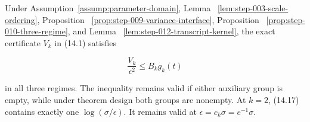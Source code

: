 \begin{lemma}\label{lem:step-014-variance-specialization}
Under Assumption~\ref{assump:parameter-domain}, Lemma~
\ref{lem:step-003-scale-ordering}, Proposition~
\ref{prop:step-009-variance-interface}, Proposition~
\ref{prop:step-010-three-regime}, and Lemma~
\ref{lem:step-012-transcript-kernel}, the exact certificate \(V_k\) in (14.1)
satisfies

\[
\boxed{\frac{V_k}{\epsilon^2}\leq B_kg_k(t)}
\tag{14.17}
\]

in all three regimes. The inequality remains valid if either auxiliary group
is empty, while under theorem design both groups are nonempty. At \(k=2\),
(14.17) contains exactly one \(\log(\sigma/\epsilon)\). It remains valid at
\(\epsilon=c_k\sigma=e^{-1}\sigma\).
\end{lemma}

